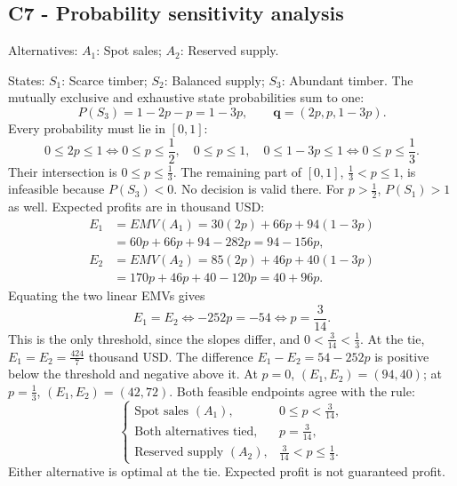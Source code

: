 \subsection*{C7 - Probability sensitivity analysis }
\label{sol:timber-supply-agreement-c7}
Alternatives: $A_1$: Spot sales; $A_2$: Reserved supply.\par
States: $S_1$: Scarce timber; $S_2$: Balanced supply; $S_3$: Abundant timber.
The mutually exclusive and exhaustive state probabilities sum to one:
\[P(S_3)=1-2p-p=1-3p,\qquad\boldsymbol{q}=(2p,p,1-3p).\]
Every probability must lie in $[0,1]$:
\[0\le2p\le1\iff0\le p\le\frac12,\quad 0\le p\le1,\quad 0\le1-3p\le1\iff0\le p\le\frac13.\]
Their intersection is $\boxed{0\le p\le \frac{1}{3}}$.
The remaining part of $[0,1]$, $\frac{1}{3}<p\le1$, is infeasible because $P(S_3)<0$. No decision is valid there.
For $p>\frac12$, $P(S_1)>1$ as well.
Expected profits are in thousand USD:
\begin{align*}
E_1&=EMV(A_1)=30(2p)+66p+94(1-3p)\\&=60p+66p+94-282p=94-156p,\\
E_2&=EMV(A_2)=85(2p)+46p+40(1-3p)\\&=170p+46p+40-120p=40+96p.
\end{align*}
Equating the two linear EMVs gives
\[E_1=E_2\iff -252p=-54\iff\boxed{p=\frac{3}{14}}.\]
This is the only threshold, since the slopes differ, and $0<\frac{3}{14}<\frac{1}{3}$. At the tie, $E_1=E_2=\frac{424}{7}$ thousand USD.
The difference $E_1-E_2=54-252p$ is positive below the threshold and negative above it.
At $p=0$, $(E_1,E_2)=(94,40)$; at $p=\frac{1}{3}$, $(E_1,E_2)=(42,72)$.
Both feasible endpoints agree with the rule:
\[\boxed{\begin{cases}
\text{Spot sales }(A_1),&0\le p<\frac{3}{14},\\
\text{Both alternatives tied},&p=\frac{3}{14},\\
\text{Reserved supply }(A_2),&\frac{3}{14}<p\le\frac{1}{3}.
\end{cases}}\]
Either alternative is optimal at the tie. Expected profit is not guaranteed profit.
\par\vspace{4mm}

